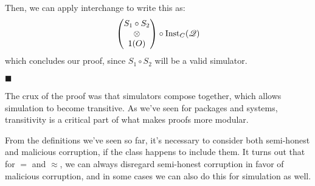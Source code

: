 \begin{theorem}
  Then, we can apply interchange to write this as:
  $$
  \begin{pmatrix}
    S_1 \circ S_2 \cr
    \otimes\cr
    1(O)
  \end{pmatrix}
  \circ
  \text{Inst}_C(\mathscr{Q})
  $$
  which concludes our proof, since $S_1 \circ S_2$ will be a valid simulator.

  $\blacksquare$
\end{theorem}

The crux of the proof was that simulators compose together,
which allows simulation to become transitive.
As we've seen for packages and systems, transitivity is
a critical part of what makes proofs more modular.

From the definitions we've seen so far, it's necessary
to consider both semi-honest and malicious corruption,
if the class happens to include them.
It turns out that for $=$ and $\approx$, we can always
disregard semi-honest corruption in favor of malicious corruption,
and in some cases we can also do this for simulation as well.

